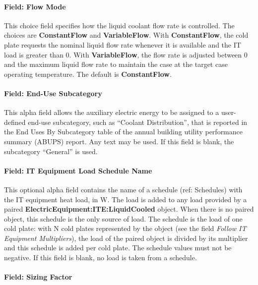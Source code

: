 \paragraph{Field: Flow Mode}\label{field-flow-mode-coilcoolingitecoldplate}

This choice field specifies how the liquid coolant flow rate is controlled. The choices are \textbf{ConstantFlow} and \textbf{VariableFlow}. With \textbf{ConstantFlow}, the cold plate requests the nominal liquid flow rate whenever it is available and the IT load is greater than 0. With \textbf{VariableFlow}, the flow rate is adjusted between 0 and the maximum liquid flow rate to maintain the case at the target case operating temperature. The default is \textbf{ConstantFlow}.

\paragraph{Field: End-Use Subcategory}\label{field-end-use-subcategory-coilcoolingitecoldplate}

This alpha field allows the auxiliary electric energy to be assigned to a user-defined end-use subcategory, such as ``Coolant Distribution'', that is reported in the End Uses By Subcategory table of the annual building utility performance summary (ABUPS) report. Any text may be used. If this field is blank, the subcategory ``General'' is used.

\paragraph{Field: IT Equipment Load Schedule Name}\label{field-it-equipment-load-schedule-name-coilcoolingitecoldplate}

This optional alpha field contains the name of a schedule (ref: Schedules) with the IT equipment heat load, in W. The load is added to any load provided by a paired \textbf{ElectricEquipment:ITE:LiquidCooled} object. When there is no paired object, this schedule is the only source of load. The schedule is the load of one cold plate: with N cold plates represented by the object (see the field \emph{Follow IT Equipment Multipliers}), the load of the paired object is divided by its multiplier and this schedule is added per cold plate. The schedule values must not be negative. If this field is blank, no load is taken from a schedule.

\paragraph{Field: Sizing Factor}\label{field-sizing-factor-coilcoolingitecoldplate}

